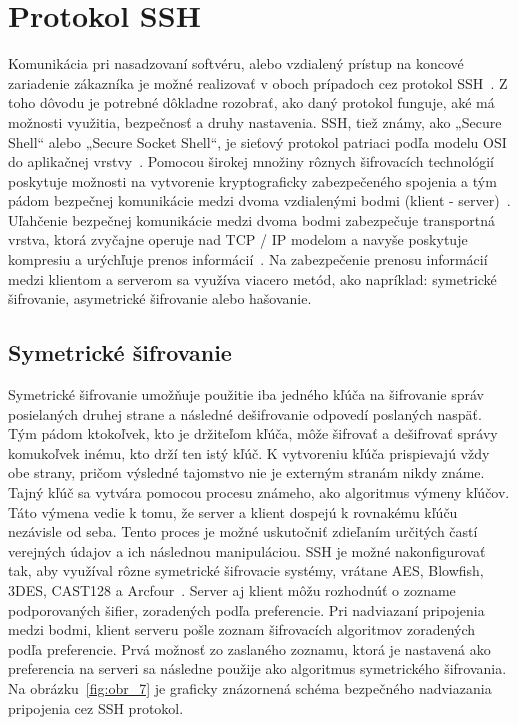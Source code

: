 \section{Protokol SSH}\label{sec:protokol-ssh}

Komunikácia pri nasadzovaní softvéru, alebo vzdialený prístup na koncové zariadenie zákazníka je možné realizovať v
oboch prípadoch cez protokol SSH~\cite{SSH}.
Z toho dôvodu je potrebné dôkladne rozobrať, ako daný protokol funguje, aké má možnosti využitia, bezpečnosť a druhy
nastavenia.
SSH, tiež známy, ako „Secure Shell“ alebo „Secure Socket Shell“, je sieťový protokol patriaci podľa modelu OSI do aplikačnej
vrstvy~\cite{OsiModel}.
Pomocou širokej množiny rôznych šifrovacích technológií poskytuje možnosti na vytvorenie kryptograficky zabezpečeného
spojenia a tým pádom bezpečnej komunikácie medzi dvoma vzdialenými bodmi (klient - server)~\cite{SshWorkflow}.
Uľahčenie bezpečnej komunikácie medzi dvoma bodmi zabezpečuje transportná vrstva, ktorá zvyčajne operuje nad TCP / IP
modelom a navyše poskytuje kompresiu a urýchľuje prenos informácií~\cite{SshSecurity}.
Na zabezpečenie prenosu informácií medzi klientom a serverom sa využíva viacero metód, ako napríklad: symetrické šifrovanie,
asymetrické šifrovanie alebo hašovanie.

\subsection{Symetrické šifrovanie}\label{subsec:symetricke-sifrovanie}

Symetrické šifrovanie umožňuje použitie iba jedného kľúča na šifrovanie správ posielaných druhej strane a následné
dešifrovanie odpovedí poslaných naspäť.
Tým pádom ktokoľvek, kto je držiteľom kľúča, môže šifrovať a dešifrovať správy komukoľvek inému, kto drží ten istý kľúč.
K vytvoreniu kľúča prispievajú vždy obe strany, pričom výsledné tajomstvo nie je externým stranám nikdy známe.
Tajný kľúč sa vytvára pomocou procesu známeho, ako algoritmus výmeny kľúčov.
Táto výmena vedie k tomu, že server a klient dospejú k rovnakému kľúču nezávisle od seba.
Tento proces je možné uskutočniť zdieľaním určitých častí verejných údajov a ich následnou manipuláciou.
SSH je možné nakonfigurovať tak, aby využíval rôzne symetrické šifrovacie systémy, vrátane AES, Blowfish, 3DES, CAST128 a
Arcfour~\cite{SshEncryption}.
Server aj klient môžu rozhodnúť o zozname podporovaných šifier, zoradených podľa preferencie.
Pri nadviazaní pripojenia medzi bodmi, klient serveru pošle zoznam šifrovacích algoritmov zoradených podľa preferencie.
Prvá možnosť zo zaslaného zoznamu, ktorá je nastavená ako preferencia na serveri sa následne použije ako algoritmus
symetrického šifrovania.
Na obrázku~\ref{fig:obr_7} je graficky znázornená schéma bezpečného nadviazania pripojenia cez SSH protokol.


